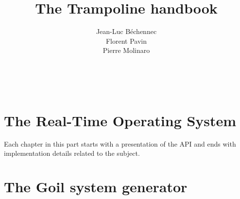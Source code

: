 \documentclass[11pt]{manual}
\title{The Trampoline handbook}
\author{Jean-Luc B\'echennec\\Florent Pavin\\Pierre Molinaro}
\begin{document}
\maketitle
~\newpage
\setcounter{tocdepth}{2}
\tableofcontents

\part{The Real-Time Operating System}

Each chapter in this part starts with a presentation of the API and ends with implementation details related to the subject.









\part{The Goil system generator}



\printindex



 
\end{document}
